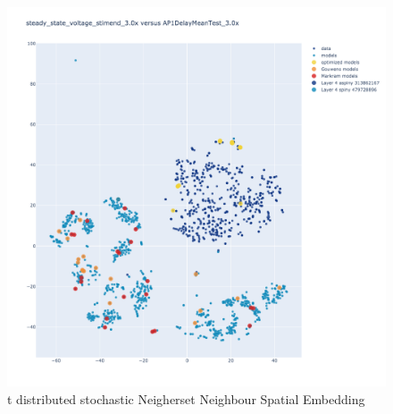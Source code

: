 \begin{figure}
	\includegraphics[width=\maxwidth{\textwidth}]{figures/TSNE.png}
	\caption{t distributed stochastic Neigherset Neighbour Spatial Embedding}
	\label{figure\arabic{figurecounter}}
\end{figure}

